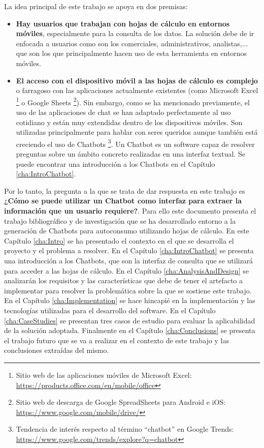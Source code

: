 La idea principal de este trabajo se apoya en dos premisas:
\begin{itemize}
	\item \textbf{Hay usuarios que trabajan con hojas de cálculo en entornos móviles}, especialmente para la consulta de los datos. La solución debe de ir enfocada a usuarios como son los comerciales, administrativos, analistas,... que son los que principalmente hacen uso de esta herramienta en entornos móviles.
	
	\item \textbf{El acceso con el dispositivo móvil a las hojas de cálculo es complejo} o farragoso con las aplicaciones actualmente existentes (como Microsoft Excel \footnote{Sitio web de las aplicaciones móviles de Microsoft Excel: \url{https://products.office.com/en/mobile/office}} o Google Sheets \footnote{Sitio web de descarga de Google SpreadSheets para Android e iOS: \url{https://www.google.com/mobile/drive/}}). Sin embargo, como se ha mencionado previamente, el uso de las aplicaciones de chat se han adaptado perfectamente al uso cotidiano y están muy extendidas dentro de los dispositivos móviles. Son utilizadas principalmente para hablar con seres queridos \cite{Montag2015} aunque también está creciendo el uso de Chatbots \footnote{Tendencia de interés respecto al término ``chatbot'' en Google Trends: \url{https://www.google.com/trends/explore?q=chatbot}}. Un Chatbot es un software capaz de resolver preguntas sobre un ámbito concreto realizadas en una interfaz textual. Se puede encontrar una introducción a los Chatbots en el Capítulo \ref{cha:IntroChatbot}.
\end{itemize}

Por lo tanto, la pregunta a la que se trata de dar respuesta en este trabajo es \textbf{¿Cómo se puede utilizar un Chatbot como interfaz para extraer la información que un usuario requiere?}. Para ello este documento presenta el trabajo bibliográfico y de investigación que se ha desarrollado entorno a la generación de Chatbots para autoconsumo utilizando hojas de cálculo. En este Capítulo \ref{cha:Intro} se ha presentado el contexto en el que se desarrolla el proyecto y el problema a resolver. En el Capítulo \ref{cha:IntroChatbot} se presenta una introducción a los Chatbots, que son la interfaz de consulta que se utilizará para acceder a las hojas de cálculo. En el Capítulo \ref{cha:AnalysisAndDesign} se analizarán los requisitos y las características que debe de tener el artefacto a implementar para resolver la problemática sobre la que se sostiene este trabajo. En el Capítulo \ref{cha:Implementation} se hace hincapié en la implementación y las tecnologías utilizadas para el desarrollo del software. En el Capítulo \ref{cha:CaseStudies} se presentan tres casos de estudio para evaluar la aplicabilidad de la solución adoptada. Finalmente en el Capítulo \ref{cha:Conclusions} se presenta el trabajo futuro que se va a realizar en el contexto de este trabajo y las conclusiones extraídas del mismo.